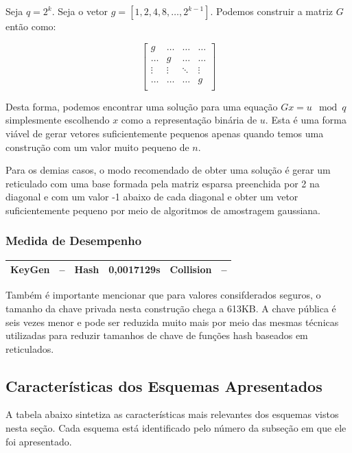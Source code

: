 \documentclass[a4paper]{article}
\begin{document}
Seja $q=2^k$. Seja o vetor $g=[1, 2, 4, 8, \ldots, 2^{k-1}]$. Podemos
construir a matriz $G$ então como:

$$
\left[\begin{matrix}
    g & \ldots & \ldots & \ldots\\
    \ldots & g & \ldots & \ldots\\
    \vdots & \vdots & \ddots & \vdots\\
    \ldots & \ldots & \ldots & g\\
  \end{matrix}\right]
$$

Desta forma, podemos encontrar uma solução para uma equação $Gx=u \mod
q$ simplesmente escolhendo $x$ como a representação binária de
$u$. Esta é uma forma viável de gerar vetores suficientemente pequenos
apenas quando temos uma construção com um valor muito pequeno de $n$.

Para os demias casos, o modo recomendado de obter uma solução é gerar
um reticulado com uma base formada pela matriz esparsa preenchida por
2 na diagonal e com um valor -1 abaixo de cada diagonal e obter um
vetor suficientemente pequeno por meio de algoritmos de amostragem
gaussiana.

\subsubsection{Medida de Desempenho}

\begin{center}
\begin{tabular}{|c|c|c|c|c|c|}
  \hline
  KeyGen & -- & Hash & 0,0017129s & Collision & --\\
  \hline
\end{tabular}
\end{center}

Também é importante mencionar que para valores consifderados seguros,
o tamanho da chave privada nesta construção chega a 613KB. A chave
pública é seis vezes menor e pode ser reduzida muito mais por meio das
mesmas técnicas utilizadas para reduzir tamanhos de chave de funções
hash baseados em reticulados.

\subsection{Características dos Esquemas Apresentados}

A tabela abaixo sintetiza as características mais relevantes dos
esquemas vistos nesta seção. Cada esquema está identificado pelo
número da subseção em que ele foi apresentado.
\end{document}
